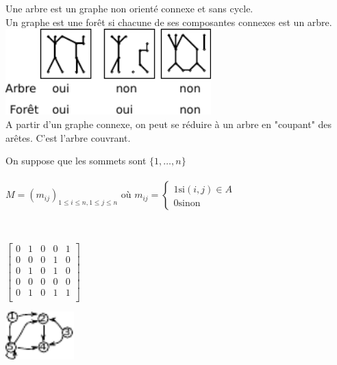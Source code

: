  Une arbre est un graphe non orienté connexe et sans cycle. \\

 Un graphe est une forêt si chacune de ses composantes connexes est un arbre. \\

\includegraphics[width=300px]{Images/fig7.pdf} \\

 A partir d'un graphe connexe, on peut se réduire à un arbre en "coupant" des arêtes. C'est l'arbre couvrant.

 On suppose que les sommets sont $\{1, \ldots , n\}$ \\

 \\$M = \displaystyle{(m_{ij})_{1\leq i \leq n,1\leq j \leq n}}$ où $m_{ij} = \left\{ \begin{array}{l} 1 \mathrm{si} (i,j) \in A \\ 0 \mathrm{sinon} \end{array} \right.$

\\
\begin{minipage}{0.4\linewidth}
$\left[\begin{array}{ccccc}
	0 & 1 & 0 & 0 & 1 \\
	0 & 0 & 0 & 1 & 0 \\
	0 & 1 & 0 & 1 & 0 \\
	0 & 0 & 0 & 0 & 0 \\
	0 & 1 & 0 & 1 & 1 \\
\end{array}\right]$
\end{minipage}
\begin{minipage}{0.4\linewidth}
\hspace{2cm} \includegraphics[width=100px]{Images/fig8.pdf}
\end{minipage}

